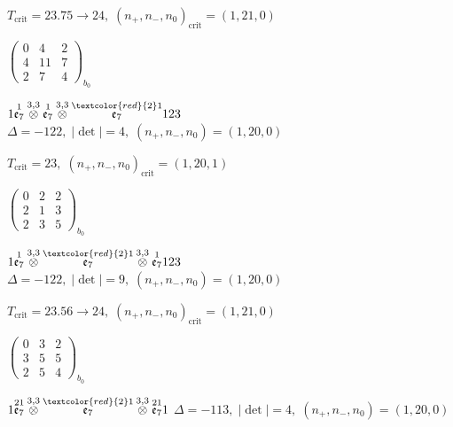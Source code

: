 \documentclass[10pt]{article}
\begin{document}
\hspace{1em}$T_{\text{crit}}=23.75 \to 24,\; (n_+,n_-,n_0)_{\text{crit}}=(1,21,0)$

\hspace{2em}$\left(\begin{smallmatrix}0 & 4 & 2 \\ 4 & 11 & 7 \\ 2 & 7 & 4\end{smallmatrix}\right)_{\!b_0}$

\smallskip

$1\overset{1}{\mathfrak{e}_7}\overset{3,3}{\otimes}\overset{1}{\mathfrak{e}_7}\overset{3,3}{\otimes}\overset{\textcolor{red}{2}1}{\mathfrak{e}_7}123$ \quad $\Delta=-122,\; |\det|=4,\; (n_+,n_-,n_0)=(1,20,0)$

\hspace{1em}$T_{\text{crit}}=23,\; (n_+,n_-,n_0)_{\text{crit}}=(1,20,1)$

\hspace{2em}$\left(\begin{smallmatrix}0 & 2 & 2 \\ 2 & 1 & 3 \\ 2 & 3 & 5\end{smallmatrix}\right)_{\!b_0}$

$1\overset{1}{\mathfrak{e}_7}\overset{3,3}{\otimes}\overset{\textcolor{red}{2}1}{\mathfrak{e}_7}\overset{3,3}{\otimes}\overset{1}{\mathfrak{e}_7}123$ \quad $\Delta=-122,\; |\det|=9,\; (n_+,n_-,n_0)=(1,20,0)$

\hspace{1em}$T_{\text{crit}}=23.56 \to 24,\; (n_+,n_-,n_0)_{\text{crit}}=(1,21,0)$

\hspace{2em}$\left(\begin{smallmatrix}0 & 3 & 2 \\ 3 & 5 & 5 \\ 2 & 5 & 4\end{smallmatrix}\right)_{\!b_0}$

\smallskip

$1\overset{21}{\mathfrak{e}_7}\overset{3,3}{\otimes}\overset{\textcolor{red}{2}1}{\mathfrak{e}_7}\overset{3,3}{\otimes}\overset{21}{\mathfrak{e}_7}1$ \quad $\Delta=-113,\; |\det|=4,\; (n_+,n_-,n_0)=(1,20,0)$
\end{document}
